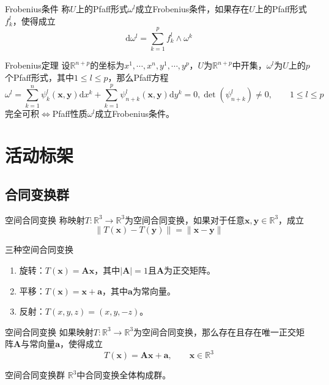 \documentclass[lang = cn, scheme = chinese, thmcnt = section]{elegantbook}
\newcommand{\R}{\mathbb{R}}            %
\newcommand{\bs}{\boldsymbol}          %
\newcommand{\dd}{\mathrm{d}}           %
\begin{document}
\begin{definition}{Frobenius条件}
	称$U$上的Pfaff形式$\omega^l$成立Frobenius条件，如果存在$U$上的Pfaff形式$f_k^l$，使得成立%
	$$
	\dd\omega^l=\sum_{k=1}^{p}f_k^l\wedge \omega^k
	$$
\end{definition}

\begin{theorem}{Frobenius定理}
	设$\R^{n+p}$的坐标为$x^1,\cdots,x^n,y^1,\cdots,y^p$，$U$为$\R^{n+p}$中开集，$\omega^{l}$为$U$上的$p$个Pfaff形式，其中$1\le l \le p$，那么Pfaff方程%
	$$
	\omega^l=\sum_{k=1}^{n}\psi_k^l(\bs{x},\bs{y})\dd x^k+\sum_{k=1}^{p}\psi_{n+k}^l(\bs{x},\bs{y})\dd y^k=0,
	\det(\psi_{n+k}^l)\ne 0,
	\qquad
	1\le l \le p
	$$
	完全可积$\iff$Pfaff性质$\omega^{l}$成立Frobenius条件。
\end{theorem}

\section{活动标架}

\subsection{合同变换群}

\begin{definition}{空间合同变换}
	称映射$T:\R^3\to\R^3$为空间合同变换，如果对于任意$\bs{x},\bs{y}\in\R^3$，成立%
	$$
	\|T(\bs{x})-T(\bs{y})\|
	=\|\bs{x}-\bs{y}\|
	$$
\end{definition}

\begin{definition}{三种空间合同变换}
	\begin{enumerate}
		\item 旋转：$T(\bs{x})=\bs{A}\bs{x}$，其中$|\bs{A}|=1$且$\bs{A}$为正交矩阵。
		\item 平移：$T(\bs{x})=\bs{x}+\bs{a}$，其中$\bs{a}$为常向量。
		\item 反射：$T(x,y,z)=(x,y,-z)$。
	\end{enumerate}
\end{definition}

\begin{theorem}{空间合同变换}
	如果映射$T:\R^3\to\R^3$为空间合同变换，那么存在且存在唯一正交矩阵$\bs{A}$与常向量$\bs{a}$，使得成立%
	$$
	T(\bs{x})=\bs{A}\bs{x}+\bs{a},\qquad
	\bs{x}\in\R^3
	$$
\end{theorem}

\begin{definition}{空间合同变换群}
	$\R^3$中合同变换全体构成群。
\end{definition}
\end{document}
